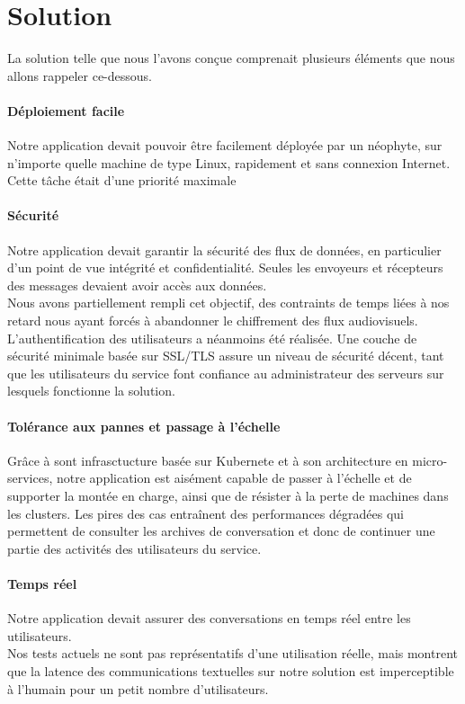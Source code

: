\section{Solution}

La solution telle que nous l'avons conçue comprenait plusieurs éléments que nous allons rappeler ce-dessous.

\paragraph{Déploiement facile} Notre application devait pouvoir être facilement déployée par un néophyte, sur n'importe quelle machine de type Linux, rapidement et sans connexion Internet. Cette tâche était d'une priorité maximale%

\paragraph{Sécurité} Notre application devait garantir la sécurité des flux de données, en particulier d'un point de vue intégrité et confidentialité. Seules les envoyeurs et récepteurs des messages devaient avoir accès aux données.\\
Nous avons partiellement rempli cet objectif, des contraints de temps liées à nos retard nous ayant forcés à abandonner le chiffrement des flux audiovisuels. L'authentification des utilisateurs a néanmoins été réalisée. Une couche de sécurité minimale basée sur SSL/TLS assure un niveau de sécurité décent, tant que les utilisateurs du service font confiance au administrateur des serveurs sur lesquels fonctionne la solution.

\paragraph{Tolérance aux pannes et passage à l'échelle} Grâce à sont infrasctucture basée sur Kubernete et à son architecture en micro-services, notre application est aisément capable de passer à l'échelle et de supporter la montée en charge, ainsi que de résister à la perte de machines dans les clusters. Les pires des cas entraînent des performances dégradées qui permettent de consulter les archives de conversation et donc de continuer une partie des activités des utilisateurs du service.

\paragraph{Temps réel} Notre application devait assurer des conversations en temps réel entre les utilisateurs.\\
Nos tests actuels ne sont pas représentatifs d'une utilisation réelle, mais montrent que la latence des communications textuelles sur notre solution est imperceptible à l'humain pour un petit nombre d'utilisateurs.

